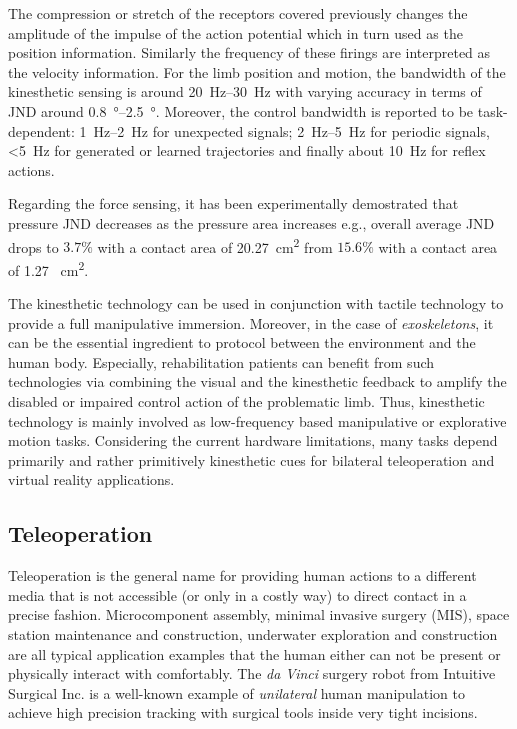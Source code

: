 The compression or stretch of the receptors covered previously changes the amplitude of the impulse of the action potential which in turn 
used as the position information. Similarly the frequency of these firings are interpreted as the velocity information. For the limb 
position and motion, the bandwidth of the kinesthetic sensing is around \SIrange{20}{30}{\hertz} with varying accuracy in terms of JND 
around \SIrange{0.8}{2.5}{\degree}. Moreover, the control bandwidth is reported to be task-dependent: \SIrange{1}{2}{\hertz} for 
unexpected signals; \SIrange{2}{5}{\hertz} for periodic signals, \SI[parse-numbers=false]{<5}{\hertz} for generated or learned 
trajectories and finally about \SI{10}{\hertz} for reflex actions. 

Regarding the force sensing, it has been experimentally demostrated that pressure JND decreases as the pressure area increases e.g., 
overall average JND drops to $3.7\%$ with a contact area of \SI{20.27}{\centi\meter\squared} from $15.6\%$ with a contact area of \SI{1.27
}{\centi\meter\squared}. 

The kinesthetic technology can be used in conjunction with tactile technology to provide a full manipulative immersion. Moreover, in the 
case of \emph{exoskeletons}, it can be the essential ingredient to protocol between the environment and the human body. Especially, 
rehabilitation patients can benefit from such technologies via combining the visual and the kinesthetic feedback to amplify the disabled 
or impaired control action of the problematic limb. Thus, kinesthetic technology is mainly involved as low-frequency based manipulative 
or explorative motion tasks. Considering the current hardware limitations, many tasks depend primarily and rather primitively kinesthetic 
cues for bilateral teleoperation and virtual reality applications.


\subsection{Teleoperation}
Teleoperation is the general name for providing human actions to a different media that is not accessible (or only in a costly way) to 
direct contact in a precise fashion. Microcomponent assembly, minimal invasive surgery (MIS), space station maintenance and construction, 
underwater exploration and construction are all typical application examples that the human either can not be present or physically 
interact with comfortably. The \emph{da Vinci}\raisebox{0.5ex}{\scriptsize\texttrademark} surgery robot from Intuitive Surgical Inc. is a 
well-known example of \emph{unilateral} human manipulation to achieve high precision tracking with surgical tools inside very tight 
incisions. 

